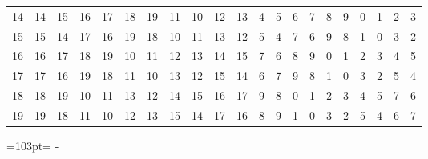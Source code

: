 \documentclass[10pt,a4paper]{article}
\newcommand{\needspace}[1]{\par\penalty-100\begingroup\dimen0=#1\relax\dimen2=\pagegoal
  \advance\dimen2-\pagetotal\ifdim\dimen0>\dimen2\relax\ifdim\dimen2>0pt\vfil\break\fi\fi
  \endgroup}
\numberwithin{equation}{section}
\begin{document}
{\begin{longtable}{@{}r|rrrrrrrrrrrrrrrrrrrr@{}}
14 & 14 & 15 & 16 & 17 & 18 & 19 & 11 & 10 & 12 & 13 & 4 & 5 & 6 & 7 & 8 & 9 & 0 & 1 & 2 & 3\\
15 & 15 & 14 & 17 & 16 & 19 & 18 & 10 & 11 & 13 & 12 & 5 & 4 & 7 & 6 & 9 & 8 & 1 & 0 & 3 & 2\\
16 & 16 & 17 & 18 & 19 & 10 & 11 & 12 & 13 & 14 & 15 & 7 & 6 & 8 & 9 & 0 & 1 & 2 & 3 & 4 & 5\\
17 & 17 & 16 & 19 & 18 & 11 & 10 & 13 & 12 & 15 & 14 & 6 & 7 & 9 & 8 & 1 & 0 & 3 & 2 & 5 & 4\\
18 & 18 & 19 & 10 & 11 & 13 & 12 & 14 & 15 & 16 & 17 & 9 & 8 & 0 & 1 & 2 & 3 & 4 & 5 & 7 & 6\\*
19 & 19 & 18 & 11 & 10 & 12 & 13 & 15 & 14 & 17 & 16 & 8 & 9 & 1 & 0 & 3 & 2 & 5 & 4 & 6 & 7\\
\bottomrule\end{longtable}}
\needspace{103pt}
\end{document}
